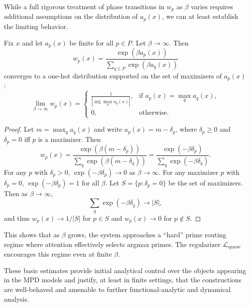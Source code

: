 \documentclass[11pt]{article}
\begin{document}
While a full rigorous treatment of phase transitions in $w_p$ as $\beta$ varies requires additional assumptions on the distribution of $a_p(x)$, we can at least establish the limiting behavior.

\begin{proposition}
\label{prop:ZeroTemp}
Fix $x$ and let $a_p(x)$ be finite for all $p\in P$. Let $\beta\to\infty$. Then
\[
w_p(x) = \frac{\exp(\beta a_p(x))}{\sum_{q\in P} \exp(\beta a_q(x))}
\]
converges to a one-hot distribution supported on the set of maximizers of $a_p(x)$:
\[
\lim_{\beta\to\infty} w_p(x) =
\begin{cases}
\frac{1}{|\arg\max_q a_q(x)|}, &\text{if } a_p(x) = \max_q a_q(x),\\
0, &\text{otherwise.}
\end{cases}
\]
\end{proposition}

\begin{proof}
Let $m = \max_q a_q(x)$ and write $a_p(x) = m - \delta_p$, where $\delta_p\ge 0$ and $\delta_p=0$ iff $p$ is a maximizer. Then
\[
w_p(x) = \frac{\exp(\beta (m - \delta_p))}{\sum_q \exp(\beta (m - \delta_q))}
= \frac{\exp(-\beta \delta_p)}{\sum_q \exp(-\beta \delta_q)}.
\]
For any $p$ with $\delta_p>0$, $\exp(-\beta \delta_p)\to 0$ as $\beta\to\infty$. For any maximizer $p$ with $\delta_p=0$, $\exp(-\beta \delta_p)=1$ for all $\beta$. Let $S = \{p:\delta_p=0\}$ be the set of maximizers. Then as $\beta\to\infty$,
\[
\sum_q \exp(-\beta\delta_q) \to |S|,
\]
and thus $w_p(x)\to 1/|S|$ for $p\in S$ and $w_p(x)\to 0$ for $p\notin S$.
\end{proof}

This shows that as $\beta$ grows, the system approaches a ``hard'' prime routing regime where attention effectively selects argmax primes. The regularizer $\mathcal{L}_{\mathrm{sparse}}$ encourages this regime even at finite $\beta$.

\bigskip

These basic estimates provide initial analytical control over the objects appearing in the MPD models and justify, at least in finite settings, that the constructions are well-behaved and amenable to further functional-analytic and dynamical analysis.
\nocite{*}
  

\end{document}

